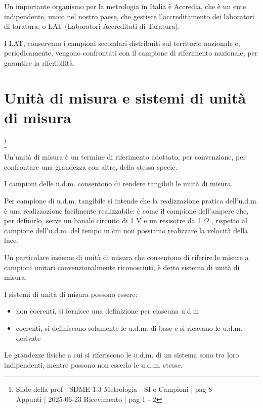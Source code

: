 Un importante organismo per la metrologia in Italia è Accredia, che è un ente indipendente, unico nel nostro paese, che gestisce l'accreditamento dei laboratori di taratura, 
o LAT (Laboratori Accreditati di Taratura). \newline 

I LAT, conservano i campioni secondari distribuiti sul territorio nazionale e, periodicamente, vengono confrontati con il campione di riferimento nazionale, per garantire la riferibilità. \newline 

\newpage 

\section{Unità di misura e sistemi di unità di misura} 
\footnote{Slide della prof | SDME 1.3 Metrologia - SI e Campioni | pag 8 \\
Appunti | 2025-06-23 Ricevimento | pag 1 - 2}

Un'unità di misura è un termine di riferimento adottato, per convenzione, per confrontare una grandezza con altre, della stessa specie.\newline 

I campioni delle u.d.m. consentono di rendere tangibili le unità di misura. \newline 

Per campione di u.d.m. tangibile si intende che la realizzazione pratica dell'u.d.m. è una realizzazione facilmente realizzabile: 
è come il campione dell'ampere che, per definirlo, serve un banale circuito di 1 V e un resisotre da 1 $\Omega$ , 
rispetto al campione dell'u.d.m. del tempo in cui non possiamo realizzare la velocità della luce. \newline 

Un particolare insieme di unità di misura che consentono di riferire le misure a campioni 
unitari convenzionalmente riconosciuti, è detto sistema di unità di misura. \newline 

I sistemi di unità di misura possono essere: 
\begin{itemize}
    \item non coerenti, si fornisce una definizione per ciascuna u.d.m 
    \item coerenti, si definiscono solamente le u.d.m. di base e si ricavano le u.d.m. derivate 
\end{itemize}

Le grandezze fisiche a cui si riferiscono le u.d.m. di un sistema sono tra loro indipendenti, 
mentre possono non esserlo le u.d.m. stesse. \newline 

